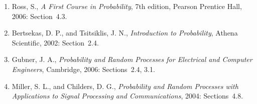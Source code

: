\begin{small}
\begin{enumerate}
\item Ross, S., \emph{A First Course in Probability}, 7th edition, Pearson Prentice Hall, 2006: Section~4.3.
\item Bertsekas, D. P., and Tsitsiklis, J. N., \emph{Introduction to Probability}, Athena Scientific, 2002: Section~2.4.
\item Gubner, J. A., \emph{Probability and Random Processes for Electrical and Computer Engineers}, Cambridge, 2006: Sections~2.4, 3.1.
\item Miller, S. L., and Childers, D. G., \emph{Probability and Random Processes with Applications to Signal Processing and Communications}, 2004: Sections~4.8.
\end{enumerate}
\end{small}

